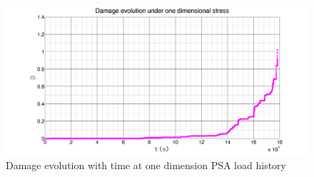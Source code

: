 \documentclass[3p,times,number,review]{elsarticle}
\begin{document}
\begin{figure}[!h]
	\centering
	\includegraphics[width=\textwidth]{figures//damage1d.png} 
	\caption{Damage evolution with time at one dimension PSA load history}
	\label{damage1d}
\end{figure}

 \newpage
\end{document}
